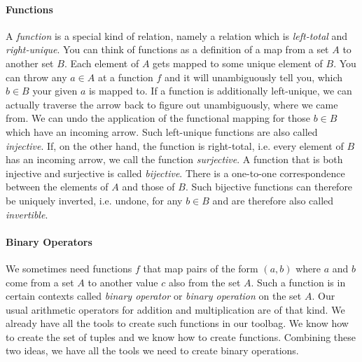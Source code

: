 \paragraph{Functions} A \emph{function} is a special kind of relation, namely a relation which is \emph{left-total} and \emph{right-unique}. You can think of functions as a definition of a map from a set $A$ to another set $B$. Each element of $A$ gets mapped to some unique element of $B$. You can throw any $a \in A$ at a function $f$ and it will unambiguously tell you, which $b \in B$ your given $a$ is mapped to. If a function is additionally left-unique, we can actually traverse the arrow back to figure out unambiguously, where we came from. We can undo the application of the functional mapping for those $b \in B$ which have an incoming arrow. Such left-unique functions are also called \emph{injective}. If, on the other hand, the function is right-total, i.e. every element of $B$ has an incoming arrow, we call the function \emph{surjective}. A function that is both injective and surjective is called \emph{bijective}. There is a one-to-one correspondence between the elements of $A$ and those of $B$. Such bijective functions can therefore be uniquely inverted, i.e. undone, for any $b \in B$ and are therefore also called \emph{invertible}.


\paragraph{Binary Operators} We sometimes need functions $f$ that map pairs of the form $(a,b)$ where $a$ and $b$ come from a set $A$ to another value $c$ also from the set $A$. Such a function is in certain contexts called \emph{binary operator} or \emph{binary operation} on the set $A$. Our usual arithmetic operators for addition and multiplication are of that kind. We already have all the tools to create such functions in our toolbag. We know how to create the set of tuples and we know how to create functions. Combining these two ideas, we have all the tools we need to create binary operations.


